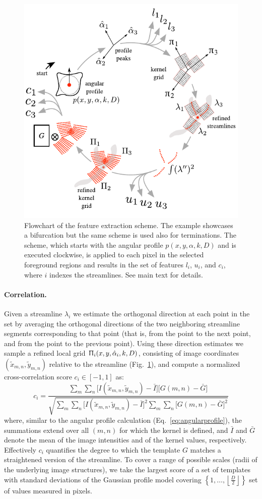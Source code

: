 \begin{figure}[!t]
	\centering
	\includegraphics[width=0.5\columnwidth]{fig4}
	\caption{Flowchart of the feature extraction scheme. The example showcases a bifurcation but the same scheme is used also for terminations. The scheme, which starts with the angular profile $p(x,y,\alpha,k,D)$ and is executed clockwise, is applied to each pixel in the selected foreground regions and results in the set of features $l_i$, $u_i$, and $c_i$, where $i$ indexes the streamlines. See main text for details.}
	\label{fig4}
\end{figure}

\paragraph{Correlation.} Given a streamline $\lambda_{i}$ we estimate the orthogonal direction at each point in the set by averaging the orthogonal directions of the two neighboring streamline segments corresponding to that point (that is, from the point to the next point, and from the point to the previous point). Using these direction estimates we sample a refined local grid $\Uppi_{i}(x,y,\hat{\alpha}_{i},k,D)$, consisting of image coordinates $(\tilde{x}_{m,n},\tilde{y}_{m,n})$ relative to the streamline (Fig.~\ref{fig4}), and compute a normalized cross-correlation \cite{lewis1995fast} score $c_{i}\in[-1,1]$ as:
\begin{equation} 
\label{eq:correlation}
c_{i} = \frac{\sum_{m}\sum_{n} \bigl[I(\tilde{x}_{m,n},\tilde{y}_{m,n})-\bar{I}\bigr] \bigl[G(m,n)-\bar{G}\bigr]}{\sqrt{\sum_{m}\sum_{n}\bigl[I(\tilde{x}_{m,n},\tilde{y}_{m,n})-\bar{I}\bigr]^{2}\sum_{m}\sum_{n}\bigl[G(m,n)-\bar{G}\bigr]^{2}}}
\end{equation}
where, similar to the angular profile calculation (Eq.~\ref{eq:angularprofile}), the summations extend over all $(m,n)$ for which the kernel is defined, and $\bar{I}$ and $\bar{G}$ denote the mean of the image intensities and of the kernel values, respectively. Effectively $c_{i}$ quantifies the degree to which the template $G$ matches a straightened version of the streamline. To cover a range of possible scales (radii of the underlying image structures), we take the largest score of a set of templates with standard deviations of the Gaussian profile model \cite{su2012junction} covering $\left\lbrace 1,\dots,\left\lfloor{\frac{D}{2}}\right\rfloor\right\rbrace $ set of values measured in pixels.

